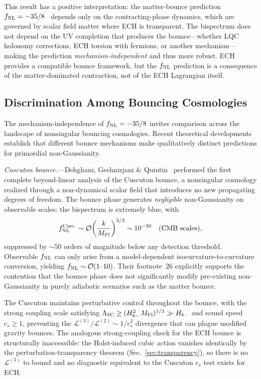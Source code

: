 \documentclass[aps,prd,twocolumn,superscriptaddress,showpacs,preprintnumbers,nofootinbib,longbibliography,floatfix]{revtex4-2}
\newcommand{\MPl}{M_{\rm Pl}}
\newcommand{\fnl}{f_{\rm NL}}
\begin{document}
This result has a positive interpretation: the matter-bounce prediction $\fnl = -35/8$~\cite{Cai:2009fn} depends only on the contracting-phase dynamics, which are governed by scalar field matter where ECH is transparent. The bispectrum does not depend on the UV completion that produces the bounce---whether LQC holonomy corrections, ECH torsion with fermions, or another mechanism---making the prediction \emph{mechanism-independent} and thus more robust. ECH provides a compatible bounce framework, but the $\fnl$ prediction is a consequence of the matter-dominated contraction, not of the ECH Lagrangian itself.

\subsection{Discrimination Among Bouncing Cosmologies}\label{sec:discrimination}

The mechanism-independence of $\fnl = -35/8$ invites comparison across the landscape of nonsingular bouncing cosmologies. Recent theoretical developments establish that different bounce mechanisms make qualitatively distinct predictions for primordial non-Gaussianity.

\textit{Cuscuton bounce.}---Dehghani, Geshnizjani \& Quintin~\cite{Dehghani:2025cusc} performed the first complete beyond-linear analysis of the Cuscuton bounce, a nonsingular cosmology realized through a non-dynamical scalar field that introduces no new propagating degrees of freedom. The bounce phase generates \emph{negligible} non-Gaussianity on observable scales: the bispectrum is extremely blue, with
\begin{equation}\label{eq:cusc_fnl}
\fnl^{\rm Cusc.} \sim \mathcal{O}\!\left(\frac{k}{\MPl}\right)^{3/2} \sim 10^{-50} \quad (\text{CMB scales}),
\end{equation}
suppressed by ${\sim}50$ orders of magnitude below any detection threshold. Observable $\fnl$ can only arise from a model-dependent isocurvature-to-curvature conversion, yielding $\fnl \sim \mathcal{O}(1\text{--}10)$. Their footnote~26 explicitly supports the contention that the bounce phase does not significantly modify pre-existing non-Gaussianity in purely adiabatic scenarios such as the matter bounce.

The Cuscuton maintains perturbative control throughout the bounce, with the strong coupling scale satisfying $\Lambda_{\rm SC} \geq (H_{b-}^2\,\MPl)^{1/3} \gg H_{b-}$ and sound speed $c_s \geq 1$, preventing the $\mathcal{L}^{(3)}/\mathcal{L}^{(2)} \sim 1/c_s^2$ divergence that can plague modified gravity bounces. The analogous strong-coupling check for the ECH bounce is structurally inaccessible: the Holst-induced cubic action vanishes identically by the perturbation-transparency theorem (Sec.~\ref{sec:transparency}), so there is no $\mathcal{L}^{(3)}$ to bound and no diagnostic equivalent to the Cuscuton $c_s$ test exists for ECH.
\end{document}

